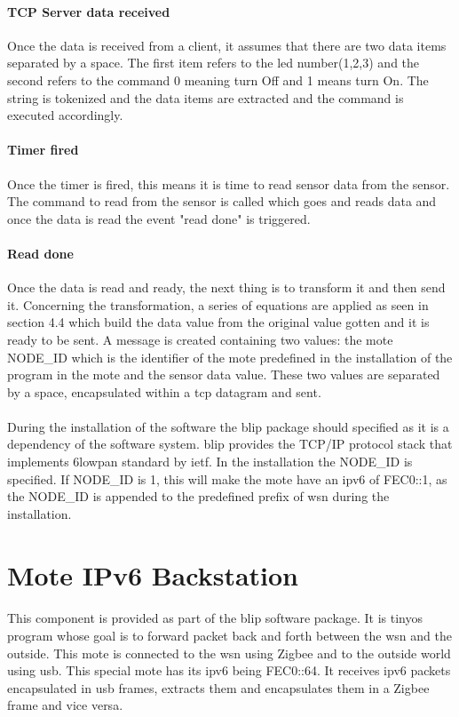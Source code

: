 \documentclass[oneside,12pt,a4paper,final]{book}
\begin{document}
\paragraph{TCP Server data received}
Once the data is received from a client, it assumes that there are two data items separated by a space. The first item refers to the led number(1,2,3) and the second refers to the command 0 meaning turn Off and 1 means turn On. The string is tokenized and the data items are extracted and the command is executed accordingly.
\paragraph{Timer fired}
Once the timer is fired, this means it is time to read sensor data from the sensor. The command to read from the sensor is called which goes and reads data and once the data is read the event "read done" is triggered.
\paragraph{Read done}
Once the data is read and ready, the next thing is to transform it and then send it. Concerning the transformation, a series of equations are applied as seen in section 4.4 which build the data value from the original value gotten and it is ready to be sent. A message is created containing two values: the mote NODE\_ID which is the identifier of the mote predefined in the installation of the program in the mote and the sensor data value. These two values are separated by a space, encapsulated within a \gls{tcp} datagram and sent.
\paragraph{}
During the installation of the software the \gls{blip} package should specified as it is a dependency of the software system. \gls{blip} provides the TCP/IP protocol stack that implements \gls{6lowpan} standard by \gls{ietf}. In  the installation the NODE\_ID is specified. If NODE\_ID is 1, this will make the mote have an \gls{ipv6} of FEC0::1, as the NODE\_ID is appended to the predefined prefix of \gls{wsn} during the installation.
\section{Mote IPv6 Backstation}
\paragraph{}
This component is provided as part of the \gls{blip} software package. It is \gls{tinyos} program whose goal is to forward packet back and forth between the \gls{wsn} and the outside. This mote is connected to the \gls{wsn} using Zigbee and to the outside world using \gls{usb}. This special mote has its \gls{ipv6} being FEC0::64. It receives \gls{ipv6} packets encapsulated in \gls{usb} frames, extracts them and encapsulates them in a Zigbee frame and vice versa.
\end{document}
